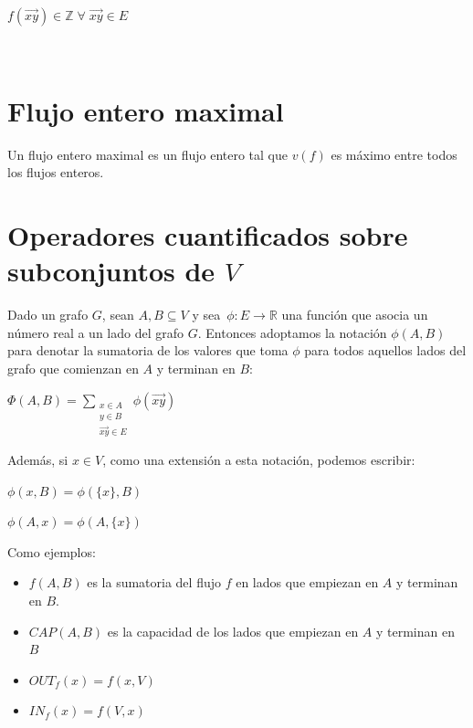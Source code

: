 \documentclass[10pt,a4paper]{article}
\begin{document}
\begin{center}
$f(\overrightarrow{xy}) \in \mathbb{Z} \;\forall\;\overrightarrow{xy} \in E$
\end{center}

\begin{center}
 
\end{center}

\section*{Flujo entero maximal}

Un flujo entero maximal es un flujo entero tal que $v(f)$ es máximo entre todos los flujos enteros.

\section*{Operadores cuantificados sobre subconjuntos de $V$}

Dado un grafo $G$, sean $A, B \subseteq V$ y sea $\phi: E\rightarrow \mathbb{R}$ una función que asocia un número real a un lado del grafo $G$. Entonces adoptamos la notación $\phi(A, B)$ para denotar la sumatoria de los valores que toma $\phi$ para todos aquellos lados del grafo que comienzan en $A$ y terminan en $B$:

\begin{center}
$\Phi(A, B) = \sum\limits_{\substack{x \in A\\ y \in B \\ \overrightarrow{xy} \in E}}\phi(\overrightarrow{xy})$
\end{center}

Además, si $x \in V$, como una extensión a esta notación, podemos escribir:

\begin{center}
$\phi (x, B) = \phi(\{x\}, B)$
\end{center}

\begin{center}
$\phi (A, x) = \phi(A, \{x\})$
\end{center}

Como ejemplos:

\begin{itemize}

	\item $f(A, B)$ es la sumatoria del flujo $f$ en lados que empiezan en $A$ y terminan en $B$.
	\item $CAP(A, B)$ es la capacidad de los lados que empiezan en $A$ y terminan en $B$
	\item $OUT_f(x) = f(x, V)$
	\item $IN_f(x) = f(V, x)$
\end{itemize}
\end{document}
